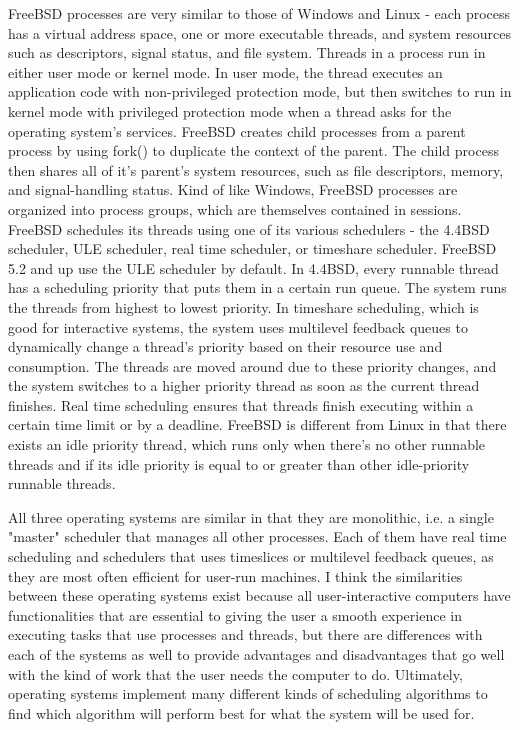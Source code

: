 \documentclass[10pt,draftclsnofoot,onecolumn,letterpaper]{IEEEtran}
\begin{document}
FreeBSD processes are very similar to those of Windows and Linux - each process has a virtual address space, one or more executable threads, and system resources such as descriptors, signal status, and file system. Threads in a process run in either user mode or kernel mode. In user mode, the thread executes an application code with non-privileged protection mode, but then switches to run in kernel mode with privileged protection mode when a thread asks for the operating system's services\cite{7}.
FreeBSD creates child processes from a parent process by using fork() to duplicate the context of the parent. The child process then shares all of it's parent's system resources, such as file descriptors, memory, and signal-handling status\cite{6}. Kind of like Windows, FreeBSD processes are organized into process groups, which are themselves contained in sessions.
FreeBSD schedules its threads using one of its various schedulers - the 4.4BSD scheduler, ULE scheduler, real time scheduler, or timeshare scheduler. FreeBSD 5.2 and up use the ULE scheduler by default. In 4.4BSD, every runnable thread has a scheduling priority that puts them in a certain run queue. The system runs the threads from highest to lowest priority\cite{5}. In timeshare scheduling, which is good for interactive systems, the system uses multilevel feedback queues to dynamically change a thread's priority based on their resource use and consumption. The threads are moved around due to these priority changes, and the system switches to a higher priority thread as soon as the current thread finishes\cite{7}. Real time scheduling ensures that threads finish executing within a certain time limit or by a deadline. FreeBSD is different from Linux in that there exists an idle priority thread, which runs only when there's no other runnable threads and if its idle priority is equal to or greater than other idle-priority runnable threads\cite{7}.

All three operating systems are similar in that they are monolithic, i.e. a single "master" scheduler that manages all other processes. Each of them have real time scheduling and schedulers that uses timeslices or multilevel feedback queues, as they are most often efficient for user-run machines. I think the similarities between these operating systems exist because all user-interactive computers have functionalities that are essential to giving the user a smooth experience in executing tasks that use processes and threads, but there are differences with each of the systems as well to provide advantages and disadvantages that go well with the kind of work that the user needs the computer to do. Ultimately, operating systems implement many different kinds of scheduling algorithms to find which algorithm will perform best for what the system will be used for.




{}
\end{document}
